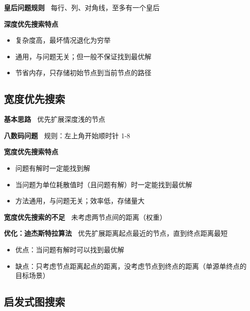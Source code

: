 \documentclass[b4paper, 10pt]{ctexart}
\makeatletter
\newenvironment{figurehere}
{\def\@captype{figure}}
{}
\makeatother
\begin{document}
\begin{multicols}{3}
\textbf{皇后问题规则\ } 每行、列、对角线，至多有一个皇后


\textbf{深度优先搜索特点\ } 
\begin{itemize}
    \item 复杂度高，最坏情况退化为穷举
    \item 通用，与问题无关；但一般不保证找到最优解
    \item 节省内存，只存储初始节点到当前节点的路径
\end{itemize}

\subsection{宽度优先搜索}

\textbf{基本思路\ } 优先扩展深度浅的节点

\textbf{八数码问题\ }
规则：左上角开始顺时针 1-8


\textbf{宽度优先搜索特点}
\begin{itemize}
    \item 问题有解时一定能找到解
    \item 当问题为单位耗散值时（且问题有解）时一定能找到最优解
    \item 方法通用，与问题无关；效率低，存储量大
\end{itemize}

\textbf{宽度优先搜索的不足\ } 未考虑两节点间的距离（权重）

\textbf{优化：迪杰斯特拉算法\ } 优先扩展距离起点最近的节点，直到终点距离最短

\begin{itemize}
    \item 优点：当问题有解时可以找到最优解
    \item 缺点：只考虑节点距离起点的距离，没考虑节点到终点的距离（单源单终点的目标场景）
\end{itemize}

\subsection{启发式图搜索}


\end{multicols}
\end{document}
